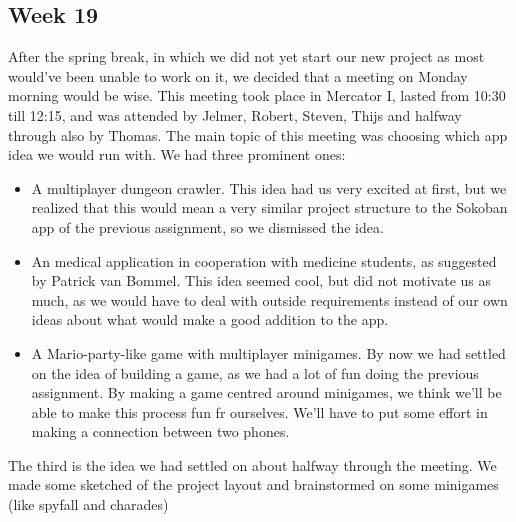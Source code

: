 \documentclass[../main.tex]{subfiles}
\begin{document}
\subsection*{Week 19}
After the spring break, in which we did not yet start our new project as most would've been unable to work on it, we decided that a meeting on Monday morning would be wise. This meeting took place in Mercator I, lasted from 10:30 till 12:15, and was attended by Jelmer, Robert, Steven, Thijs and halfway through also by Thomas.
The main topic of this meeting was choosing which app idea we would run with. We had three prominent ones:
\begin{itemize}
	\item A multiplayer dungeon crawler. This idea had us very excited at first, but we realized that this would mean a very similar project structure to the Sokoban app of the previous assignment, so we dismissed the idea.
	\item An medical application in cooperation with medicine students, as suggested by Patrick van Bommel. This idea seemed cool, but did not motivate us as much, as we would have to deal with outside requirements instead of our own ideas about what would make a good addition to the app.
	\item A Mario-party-like game with multiplayer minigames. By now we had settled on the idea of building a game, as we had a lot of fun doing the previous assignment. By making a game centred around minigames, we think we'll be able to make this process fun fr ourselves. We'll have to put some effort in making a connection between two phones.
\end{itemize}

The third is the idea we had settled on about halfway through the meeting. We made some sketched of the project layout and brainstormed on some minigames (like spyfall and charades)
\end{document}
